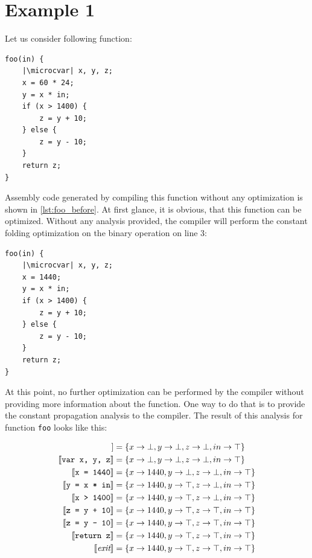 \documentclass[thesis=M,english]{FITthesis}[2019/12/23]
\newcommand{\microcvar}{\textcolor{codegreen}{\textbf{var}}}
\begin{document}
\section{Example 1}\label{sec:optim_ex1}
Let us consider following function:
\begin{verbatim}
foo(in) {
	|\microcvar| x, y, z;
	x = 60 * 24;
	y = x * in;
	if (x > 1400) {
		z = y + 10;
	} else {
		z = y - 10;
	}
	return z;
}
\end{verbatim}

Assembly code generated by compiling this function without any optimization is shown in \autoref{lst:foo_before}. At first glance, it is obvious, that this function can be optimized. Without any analysis provided, the compiler will perform the constant folding optimization on the binary operation on line 3:
\pagebreak

\begin{verbatim}
foo(in) {
	|\microcvar| x, y, z;
	x = 1440;
	y = x * in;
	if (x > 1400) {
		z = y + 10;
	} else {
		z = y - 10;
	}
	return z;
}
\end{verbatim}

At this point, no further optimization can be performed by the compiler without providing more information about the function. One way to do that is to provide the constant propagation analysis to the compiler. The result of this analysis for function \texttt{foo} looks like this:

\begin{align*}
    [\![ \emph{entry} ]\!] &= \{ x \rightarrow \bot, y \rightarrow \bot, z \rightarrow \bot, in \rightarrow \top \}\\
    [\![ \texttt{var x, y, z} ]\!] &= \{ x \rightarrow \bot, y \rightarrow \bot, z \rightarrow \bot, in \rightarrow \top \}\\
    [\![ \texttt{x = 1440} ]\!] &= \{ x \rightarrow 1440, y \rightarrow \bot, z \rightarrow \bot, in \rightarrow \top \}\\
    [\![ \texttt{y = x * in} ]\!] &= \{ x \rightarrow 1440, y \rightarrow \top, z \rightarrow \bot, in \rightarrow \top \}\\
    [\![ \texttt{x > 1400} ]\!] &= \{ x \rightarrow 1440, y \rightarrow \top, z \rightarrow \bot, in \rightarrow \top \}\\
    [\![ \texttt{z = y + 10} ]\!] &= \{ x \rightarrow 1440, y \rightarrow \top, z \rightarrow \top, in \rightarrow \top \}\\
    [\![ \texttt{z = y - 10} ]\!] &= \{ x \rightarrow 1440, y \rightarrow \top, z \rightarrow \top, in \rightarrow \top \}\\
    [\![ \texttt{return z} ]\!] &= \{ x \rightarrow 1440, y \rightarrow \top, z \rightarrow \top, in \rightarrow \top \}\\
    [\![ \emph{exit} ]\!] &= \{ x \rightarrow 1440, y \rightarrow \top, z \rightarrow \top, in \rightarrow \top \}\\
\end{align*}
\end{document}
